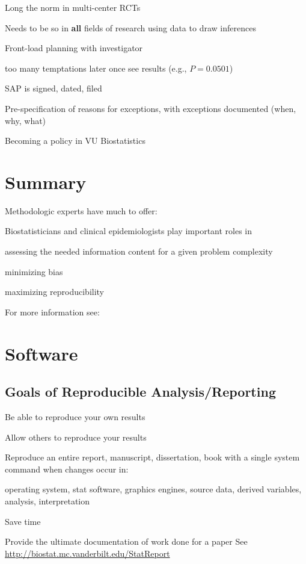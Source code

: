 \bi
\item Long the norm in multi-center RCTs
\item Needs to be so in \textbf{all} fields of research using data to
draw inferences~\cite{rub07des}
\item Front-load planning with investigator
 \bi
 \item too many temptations later once see results (e.g., $P=0.0501$)
 \ei
\item SAP is signed, dated, filed
\item Pre-specification of reasons for exceptions, with exceptions
documented (when, why, what)
\item Becoming a policy in VU Biostatistics
\ei


\section{Summary}
Methodologic experts have much to offer:
\bi
\item Biostatisticians and clinical epidemiologists play important
roles in
 \bi
 \item assessing the needed information content for a given problem
   complexity
 \item minimizing bias
 \item maximizing reproducibility
 \ei
\item For more information see:
\bi
\item {}
\item {}
\item {}
\ei
\ei

\section{Software}\label{sec:repro-software}
\subsection{Goals of Reproducible Analysis/Reporting}
\bi
\item Be able to reproduce your own results
\item Allow others to reproduce your results

\item Reproduce an entire report, manuscript, dissertation, book with
a single system command when changes occur in:
 \bi
 \item operating system, stat software, graphics engines, source data, derived
 variables, analysis, interpretation
 \ei
\item Save time
\item Provide the ultimate documentation of work done for a paper
\ei
See \url{http://biostat.mc.vanderbilt.edu/StatReport}

